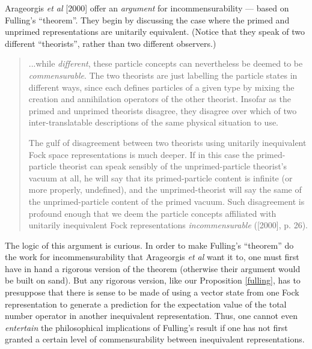 \documentclass[12pt]{article}
\theoremstyle{remark}
\theoremstyle{definition}
\begin{document}
 Arageorgis \emph{et al} 
 [2000] offer an \emph{argument}
  for incommensurability --- based on Fulling's ``theorem''.  They 
 begin by discussing the case where the primed and unprimed 
 representations are unitarily equivalent.  (Notice that they speak of 
 two different ``theorists'', rather than two different observers.)   
 
 \begin{quote}
...while \textit{different}, these particle concepts can nevertheless be
deemed to be \textit{commensurable}. The two theorists are just labelling
the particle states in different ways, since each defines particles of a
given type by mixing the creation and annihilation operators of the other
theorist. Insofar as the primed and unprimed theorists disagree, they
disagree over which of two inter-translatable descriptions of the same
physical situation to use.\smallskip 

The gulf of disagreement between two theorists using unitarily
inequivalent Fock space representations is much deeper. If in this
case the primed-particle theorist can speak sensibly of the
unprimed-particle theorist's vacuum at all, he will say that its
primed-particle content is infinite (or more properly, undefined), and
the unprimed-theorist will say the same of the unprimed-particle
content of the primed vacuum. Such disagreement is profound enough
that we deem the particle concepts affiliated with unitarily
inequivalent Fock representations \textit{incommensurable} ([2000], p.
26).
\end{quote}

The logic of this argument is curious.  
In order to make Fulling's 
``theorem'' do the work for incommensurability that Arageorgis \emph{et 
al} want it to, one must first have in hand a rigorous version of the 
theorem (otherwise their argument would be built on sand).  
But any rigorous version, like our Proposition \ref{fulling}, has to presuppose
that there is sense to be made of using a vector state from one Fock 
representation to generate a prediction for the expectation value of 
the total number operator in another inequivalent representation.  
Thus, one cannot even \emph{entertain}
 the philosophical implications of Fulling's result if one 
has not first 
granted a certain level of commensurability between inequivalent representations.  
\end{document}
